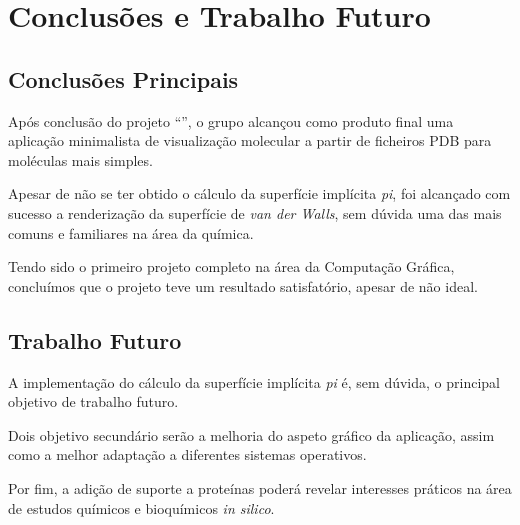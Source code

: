 \chapter{Conclusões e Trabalho Futuro}
\label{ch::conclusao}

\section{Conclusões Principais}
\label{sec::conclusao:principal}

Após conclusão do projeto ``\appname'', o grupo alcançou como produto final uma aplicação minimalista de visualização molecular a partir de ficheiros \ac{PDB} para moléculas mais simples.

Apesar de não se ter obtido o cálculo da superfície implícita \textit{pi}, foi alcançado com sucesso a renderização da superfície de \textit{van der Walls}, sem dúvida uma das mais comuns e familiares na área da química.

Tendo sido o primeiro projeto completo na área da Computação Gráfica, concluímos que o projeto teve um resultado satisfatório, apesar de não ideal.


\section{Trabalho Futuro}
\label{sec::conclusao:futuro}

A implementação do cálculo da superfície implícita \textit{pi} é, sem dúvida, o principal objetivo de trabalho futuro.

Dois objetivo secundário serão a melhoria do aspeto gráfico da aplicação, assim como a melhor adaptação a diferentes sistemas operativos.

Por fim, a adição de suporte a proteínas poderá revelar interesses práticos na área de estudos químicos e bioquímicos \textit{in silico}.
